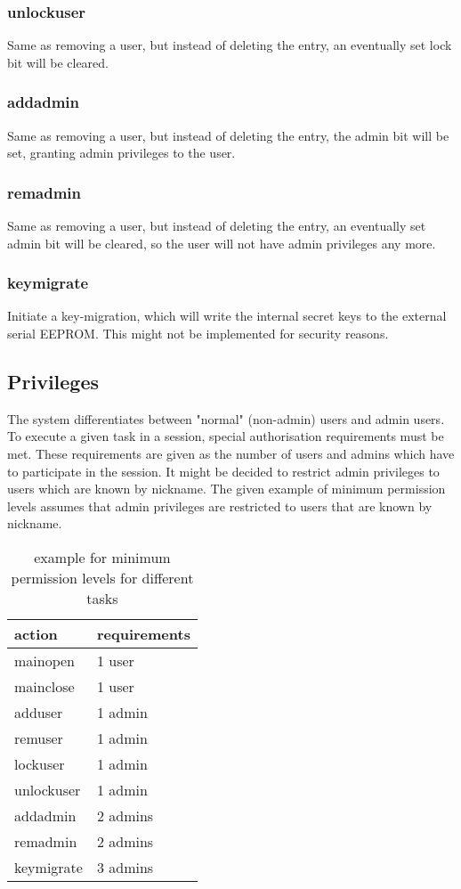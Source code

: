 \subsubsection{unlockuser}
Same as removing a user, but instead of deleting the entry, an eventually set lock bit will be cleared.

\subsubsection{addadmin}
Same as removing a user, but instead of deleting the entry, the admin bit will be set, granting admin privileges to the user.

\subsubsection{remadmin}
Same as removing a user, but instead of deleting the entry, an eventually set admin bit will be cleared, so the user will not have admin privileges any more.

\subsubsection{keymigrate}
Initiate a key-migration, which will write the internal secret keys to the external serial EEPROM. This might not be implemented for security reasons.


\subsection{Privileges}
The system differentiates between "normal" (non-admin) users and admin users. To execute a given task in a session, special authorisation requirements must be met. These requirements are given as the number of users and admins which have to participate in the session. It might be decided to restrict admin privileges to users which are known by nickname. The given example of minimum permission levels assumes that admin privileges are restricted to users that are known by nickname.
\begin{table}
\caption{example for minimum permission levels for different tasks}
\begin{tabular}{|l|l|} \hline
    action     & requirements \\ \hline
	mainopen   & 1 user   \\
	mainclose  & 1 user   \\
	adduser    & 1 admin  \\
	remuser    & 1 admin  \\
	lockuser   & 1 admin  \\
	unlockuser & 1 admin  \\
	addadmin   & 2 admins  \\
	remadmin   & 2 admins  \\
	keymigrate & 3 admins  \\
    \hline
\end{tabular}
\end{table}
